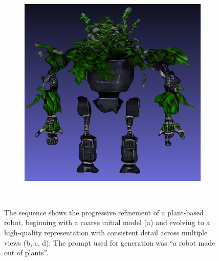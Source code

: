 \begin{figure}[H]
\begin{subfigure}[b]{0.27\textwidth}
        \includegraphics[width=\textwidth]{figures/future/plantRobot_fine_back.png}
        \caption{}
    \end{subfigure}
    \caption{The sequence shows the progressive refinement of a plant-based robot, beginning with a coarse initial model (a) and evolving to a high-quality representation with consistent detail across multiple views (b, c, d). The prompt used for generation was ``a robot made out of plants''.}~\label{fig:GenieAI_robot}
\end{figure}

